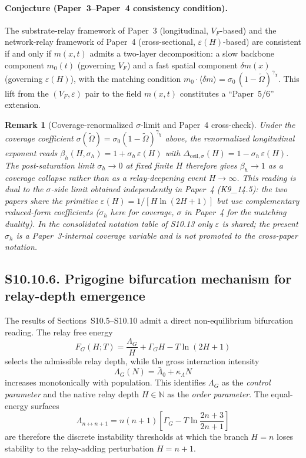 \documentclass[11pt]{article}
\newtheorem{remark}{Remark}
\begin{document}
\paragraph{Conjecture (Paper~3--Paper~4 consistency condition).}
The substrate-relay framework of Paper~3 (longitudinal, $V_F$-based) and
the network-relay framework of Paper~4 (cross-sectional, $\varepsilon(H)$-based)
are consistent if and only if $m(x,t)$ admits a two-layer decomposition:
a slow backbone component $m_0(t)$ (governing $V_F$) and a fast spatial
component $\delta m(x)$ (governing $\varepsilon(H)$), with the matching condition
$m_0 \cdot \langle\delta m\rangle = \sigma_0\,(1-\tilde\Omega)^{\gamma_\chi}$.
This lift from the $(V_F,\varepsilon)$ pair to the field $m(x,t)$ constitutes
a ``Paper~5/6'' extension.

\begin{remark}[Coverage-renormalized $\sigma$-limit and Paper~4 cross-check]
\label{rem:S10_10_5_sigma_duality}
Under the coverage coefficient $\sigma(\tilde\Omega)=\sigma_0(1-\tilde\Omega)^{\gamma_\chi}$ above, the renormalized longitudinal exponent reads $\beta_h(H,\sigma_h)=1+\sigma_h\,\varepsilon(H)$ with $\Delta_{\mathrm{ceil},\sigma}(H)=1-\sigma_h\,\varepsilon(H)$.  The post-saturation limit $\sigma_h\to 0$ at fixed finite $H$ therefore gives $\beta_h\to 1$ as a coverage collapse rather than as a relay-deepening event $H\to\infty$.  This reading is dual to the $\sigma$-side limit obtained independently in Paper~4 (K9\_14.5): the two papers share the primitive $\varepsilon(H)=1/[H\ln(2H+1)]$ but use complementary reduced-form coefficients ($\sigma_h$ here for coverage, $\sigma$ in Paper~4 for the matching duality).  In the consolidated notation table of S10.13 only $\varepsilon$ is shared; the present $\sigma_h$ is a Paper~3-internal coverage variable and is not promoted to the cross-paper notation.
\end{remark}


\subsection*{S10.10.6. Prigogine bifurcation mechanism for relay-depth emergence}
\label{sec:S10_10_6_prigogine}

The results of Sections~S10.5--S10.10 admit a direct non-equilibrium
bifurcation reading.
The relay free energy
\[
F_G(H;T)=\frac{\Lambda_G}{H}+\Gamma_G H-T\ln(2H+1)
\]
selects the admissible relay depth, while the gross interaction intensity
\[
\Lambda_G(N)=\bar\Lambda_0+\kappa_\Lambda N
\]
increases monotonically with population.
This identifies $\Lambda_G$ as the \emph{control parameter} and the native relay
depth $H\in\mathbb{N}$ as the \emph{order parameter}.
The equal-energy surfaces
\[
\Lambda_{n\leftrightarrow n+1}=n(n+1)\!\left[\Gamma_G-T\ln\frac{2n+3}{2n+1}\right]
\]
are therefore the discrete instability thresholds at which the branch
$H=n$ loses stability to the relay-adding perturbation $H=n+1$.
\end{document}
